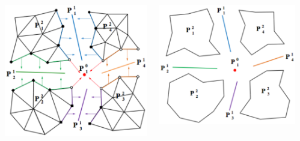 \documentclass{beamer}
\begin{document}
\begin{frame}
\begin{columns}
\begin{column}{0.1\textwidth}
    \end{column}
    \begin{column}{0.25\textwidth}
      \includegraphics[width=\textwidth]{figs/sharedEnts.eps}
    \end{column}
    \begin{column}{0.25\textwidth}
      \includegraphics[width=\textwidth]{figs/partitionModelEnts.eps}

\end{column}
\end{columns}
\end{frame}
\end{document}
